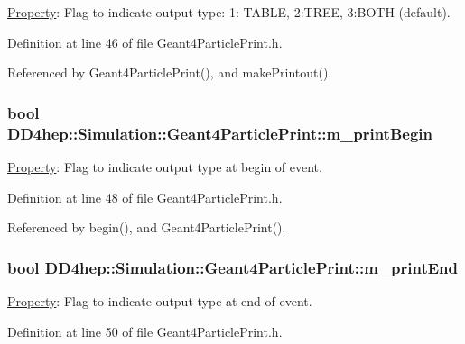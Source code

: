 \hyperlink{class_d_d4hep_1_1_property}{Property}: Flag to indicate output type: 1: TABLE, 2:TREE, 3:BOTH (default). 

Definition at line 46 of file Geant4ParticlePrint.h.

Referenced by Geant4ParticlePrint(), and makePrintout().\hypertarget{class_d_d4hep_1_1_simulation_1_1_geant4_particle_print_a876b6bca1f7dc285d064785ddf9838a2}{
\subsubsection[{m\_\-printBegin}]{\setlength{\rightskip}{0pt plus 5cm}bool {\bf DD4hep::Simulation::Geant4ParticlePrint::m\_\-printBegin}}}
\label{class_d_d4hep_1_1_simulation_1_1_geant4_particle_print_a876b6bca1f7dc285d064785ddf9838a2}


\hyperlink{class_d_d4hep_1_1_property}{Property}: Flag to indicate output type at begin of event. 

Definition at line 48 of file Geant4ParticlePrint.h.

Referenced by begin(), and Geant4ParticlePrint().\hypertarget{class_d_d4hep_1_1_simulation_1_1_geant4_particle_print_a1c439ecc16654cace16881a0c6a1414c}{
\subsubsection[{m\_\-printEnd}]{\setlength{\rightskip}{0pt plus 5cm}bool {\bf DD4hep::Simulation::Geant4ParticlePrint::m\_\-printEnd}}}
\label{class_d_d4hep_1_1_simulation_1_1_geant4_particle_print_a1c439ecc16654cace16881a0c6a1414c}


\hyperlink{class_d_d4hep_1_1_property}{Property}: Flag to indicate output type at end of event. 

Definition at line 50 of file Geant4ParticlePrint.h.

